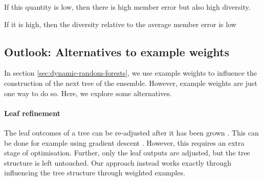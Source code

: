 \documentclass[
    a4paper, %
	fontsize=10pt, %
	twoside=false, %
]{kaobook}
\begin{document}
\begin{titlepage}
If this quantity is low, then there is high member error but also high diversity. 

If it is high, then the diversity relative to the average member error is low 




\subsection{Outlook: Alternatives to example weights}
In section \ref{sec:dynamic-random-forests}, we use example weights to influence the construction of the next tree of the ensemble. However, example weights are just one way to do so. Here, we explore some alternatives.

\paragraph{Leaf refinement} The leaf outcomes of a tree can be re-adjusted after it has been grown \cite{others}. This can be done for example using gradient descent \cite{buschj-negative-correlation-forests}. However, this requires an extra stage of optimisation. Further, only the leaf outputs are adjusted, but the tree structure is left untouched. Our approach instead works exactly through influencing the tree structure through weighted examples.


\end{titlepage}
\end{document}
